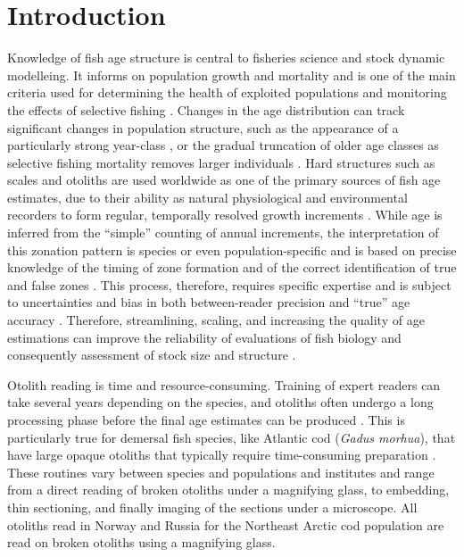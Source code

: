 \documentclass[10pt,letterpaper]{article}
\begin{document}
\section{Introduction}

Knowledge of fish age structure is central to fisheries science and stock dynamic modelleing. It informs on population growth and mortality and is one of the main criteria used for determining the health of exploited populations and monitoring the effects of selective fishing \citep{Hidalgo, Brunel}. Changes in the age distribution can track significant changes in population structure, such as the appearance of a particularly strong year-class \citep{Reglero}, or the gradual truncation of older age classes as selective fishing mortality removes larger individuals \citep{Siskey}.
Hard structures such as scales and otoliths are used worldwide as one of the primary sources of fish age estimates, due to their ability as natural physiological and environmental recorders to form regular, temporally resolved growth increments \citep{campana2001accuracy, Francis, Albuquerque}. While age is inferred from the “simple” counting of annual increments, the interpretation of this zonation pattern is species or even population-specific \citep{Hoeie} and is based on precise knowledge of the timing of zone formation and of the correct identification of true and false zones \citep{Panfili}. This process, therefore, requires specific expertise and is subject to uncertainties and bias in both between-reader precision and “true” age accuracy \citep{Francis}. Therefore, streamlining, scaling, and increasing the quality of age estimations can improve the reliability of evaluations of fish biology and consequently assessment of stock size and structure \citep{Tyler, Beamish, Ragonese}. 


Otolith reading is time and resource-consuming. Training of expert readers can take several years depending on the species, and otoliths often undergo a long processing phase before the final age estimates can be produced \citep{Carbonara}. This is particularly true for demersal fish species, like Atlantic cod (\textit{Gadus morhua}), that have large opaque otoliths that typically require time-consuming preparation \citep{denechaud2020century, smolinski2020century}. These routines vary between species and populations and institutes and range from a direct reading of broken otoliths under a magnifying glass, to embedding, thin sectioning, and finally imaging of the sections under a microscope. All otoliths read in Norway and Russia for the Northeast Arctic cod population are read on broken otoliths using a magnifying glass. 
\end{document}
